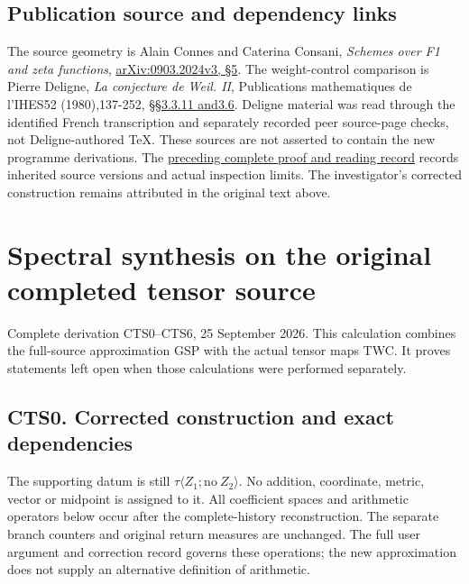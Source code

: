 \section{Publication source and dependency
links}\label{publication-source-and-dependency-links-10}

The source geometry is Alain Connes and Caterina Consani, \emph{Schemes
over F1 and zeta functions},
\href{https://arxiv.org/abs/0903.2024v3}{arXiv:0903.2024v3, §5}. The
weight-control comparison is Pierre Deligne, \emph{La conjecture de
Weil. II}, Publications mathematiques de l'IHES52 (1980),137-252,
\href{https://www.numdam.org/item/PMIHES_1980__52__137_0/}{§§3.3.11
and3.6}. Deligne material was read through the identified French
transcription and separately recorded peer source-page checks, not
Deligne-authored TeX. These sources are not asserted to contain the new
programme derivations. The
\href{https://github.com/KokunoYumeto/zeta-function-research-reader/blob/36a82ecca98addb8a98b48204e349737856c7223/workbenches/splitzero-tandem/continuations/20260924-cohomology-weight-and-character-lifts/BUILD_AND_REVIEW.md}{preceding
complete proof and reading record} records inherited source versions and
actual inspection limits. The investigator's corrected construction
remains attributed in the original text above.

\chapter{Spectral synthesis on the original completed tensor
source}\label{spectral-synthesis-on-the-original-completed-tensor-source}

Complete derivation CTS0--CTS6, 25 September 2026. This calculation
combines the full-source approximation GSP with the actual tensor maps
TWC. It proves statements left open when those calculations were
performed separately.

\section{CTS0. Corrected construction and exact
dependencies}\label{cts0.-corrected-construction-and-exact-dependencies}

The supporting datum is still
\(\tau\langle Z_1;\mathrm{no}\ Z_2\rangle\). No addition, coordinate,
metric, vector or midpoint is assigned to it. All coefficient spaces and
arithmetic operators below occur after the complete-history
reconstruction. The separate branch counters and original return
measures are unchanged. The full user argument and correction record
governs these operations; the new approximation does not supply an
alternative definition of arithmetic.

